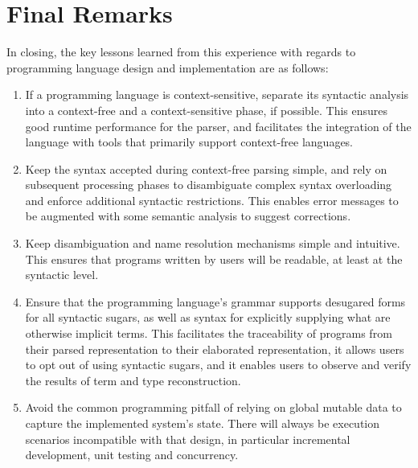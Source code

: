 \section{Final Remarks}

In closing, the key lessons learned from this experience with regards to programming language design and implementation are as follows:

\begin{enumerate}
\item
If a programming language is context-sensitive, separate its syntactic analysis into a context-free and a context-sensitive phase, if possible.
This ensures good runtime performance for the parser, and facilitates the integration of the language with tools that primarily support context-free languages.
\item
Keep the syntax accepted during context-free parsing simple, and rely on subsequent processing phases to disambiguate complex syntax overloading and enforce additional syntactic restrictions.
This enables error messages to be augmented with some semantic analysis to suggest corrections.
\item
Keep disambiguation and name resolution mechanisms simple and intuitive.
This ensures that programs written by users will be readable, at least at the syntactic level.
\item
Ensure that the programming language's grammar supports desugared forms for all syntactic sugars, as well as syntax for explicitly supplying what are otherwise implicit terms.
This facilitates the traceability of programs from their parsed representation to their elaborated representation, it allows users to opt out of using syntactic sugars, and it enables users to observe and verify the results of term and type reconstruction.
\item
Avoid the common programming pitfall of relying on global mutable data to capture the implemented system's state.
There will always be execution scenarios incompatible with that design, in particular incremental development, unit testing and concurrency.
\end{enumerate}
